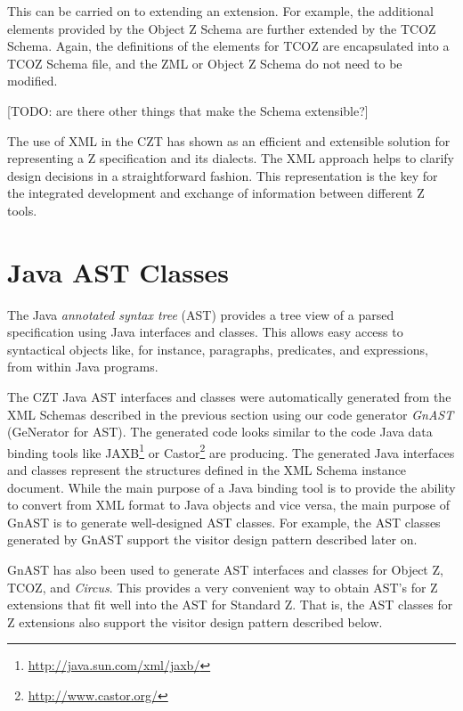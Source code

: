 \documentclass{llncs}
\newcommand{\Circus}{{\sf\slshape Circus}}
\begin{document}
  This can be carried on to extending an extension.  For example, the
  additional elements provided by the Object Z Schema are further
  extended by the TCOZ Schema.  Again, the definitions of the elements
  for TCOZ are encapsulated into a TCOZ Schema file, and the ZML or
  Object Z Schema do not need to be modified.

  [TODO: are there other things that make the Schema extensible?]

  The use of XML in the CZT has shown as an efficient and extensible
  solution for representing a Z specification and its dialects.  The
  XML approach helps to clarify design decisions in a straightforward
  fashion.  This representation is the key for the integrated
  development and exchange of information between different Z tools.

\section{Java AST Classes}\label{java-ast-classes}

  The Java \emph{annotated syntax tree} (AST) provides a tree view of
  a parsed specification using Java interfaces and classes.  This
  allows easy access to syntactical objects like, for instance,
  paragraphs, predicates, and expressions, from within Java programs.

  The CZT Java AST interfaces and classes were automatically generated
  from the XML Schemas described in the previous section using our
  code generator \emph{GnAST} (GeNerator for AST).  The generated code
  looks similar to the code Java data binding tools like
  JAXB\footnote{\url{http://java.sun.com/xml/jaxb/}} or
  Castor\footnote{\url{http://www.castor.org/}} are producing.  The
  generated Java interfaces and classes represent the structures
  defined in the XML Schema instance document.  While the main purpose
  of a Java binding tool is to provide the ability to convert from XML
  format to Java objects and vice versa, the main purpose of GnAST is
  to generate well-designed AST classes.  For example, the AST classes
  generated by GnAST support the visitor design pattern described
  later on.

  GnAST has also been used to generate AST interfaces and classes for
  Object Z, TCOZ, and \Circus.  This provides a very convenient way to
  obtain AST's for Z extensions that fit well into the AST for
  Standard Z.  That is, the AST classes for Z extensions also support
  the visitor design pattern described below.
\end{document}

